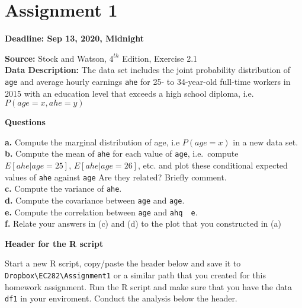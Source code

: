 \documentclass[
]{book}
\begin{document}
\hypertarget{assignment-1}{%
\section{Assignment 1}\label{assignment-1}}

\textbf{Deadline: Sep 13, 2020, Midnight}

\textbf{Source:} Stock and Watson, \(4^{th}\) Edition, Exercise 2.1\\
\textbf{Data Description:} The data set includes the joint probability distribution of \texttt{age} and average hourly earnings \texttt{ahe} for 25- to 34-year-old full-time workers in 2015 with an education level that exceeds a high school diploma, i.e.~\(P(age=x,ahe=y)\)

\textbf{Questions}

\textbf{a.} Compute the marginal distribution of age, i.e \(P(age=x)\) in a new data set.
\textbf{b.} Compute the mean of \texttt{ahe} for each value of \texttt{age}, i.e.~compute \(E[ahe|age=25]\),
\(E[ahe|age=26]\), etc. and plot these conditional expected values of \texttt{ahe} against \texttt{age} Are they related? Briefly comment.\\
\textbf{c.} Compute the variance of \texttt{ahe}.\\
\textbf{d.} Compute the covariance between \texttt{age} and \texttt{age}.\\
\textbf{e.} Compute the correlation between \texttt{age} and \texttt{ahq\ \ e}.\\
\textbf{f.} Relate your answers in (c) and (d) to the plot that you constructed in (a)

\textbf{Header for the R script}

Start a new R script, copy/paste the header below and save it to \texttt{Dropbox\textbackslash{}EC282\textbackslash{}Assignment1} or a similar path that you created for this homework assignment. Run the R script and make sure that you have the data \texttt{df1} in your enviroment. Conduct the analysis below the header.
\end{document}
